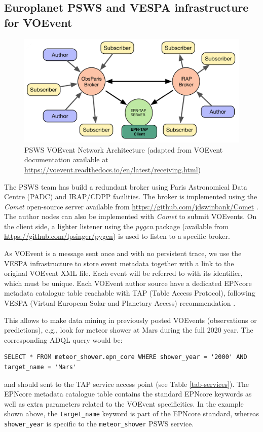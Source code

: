 \documentclass[referee,a4paper,12pt,traditabstract]{swsc}
\begin{document}
\begin{linenumbers}
\section{Europlanet PSWS and VESPA infrastructure for VOEvent}

\begin{figure}
\centering\includegraphics[width=0.7\linewidth]{figure-psws-network.png}
\caption{PSWS VOEvent Network Architecture (adapted from VOEvent documentation available at \url{https://voevent.readthedocs.io/en/latest/receiving.html})}
\label{fig:architecture}
\end{figure}

The PSWS team has build a redundant broker using Paris Astronomical Data Centre (PADC) and IRAP/CDPP facilities.  The broker is implemented using the \emph{Comet} open-source server available from \url{https://github.com/jdswinbank/Comet} \cite{Swinbank:2014ft}. The author nodes can also be implemented with \emph{Comet} to submit VOEvents. On the client side, a lighter listener using the \emph{pygcn} package (available from \url{https://github.com/lpsinger/pygcn}) is used to listen to a specific broker. 


As VOEvent is a message sent once and with no persistent trace, we use the VESPA infrastructure to store event metadata together with a link to the original VOEvent XML file. Each event will be referred to with its identifier, which must be unique. Each VOEvent author source have a dedicated EPNcore metadata catalogue table reachable with TAP (Table Access Protocol), following VESPA (Virtual European Solar and Planetary Access) recommendation \cite{vespa}.

This allows to make data mining in previously posted VOEvents (observations or predictions), e.g., look for meteor shower at Mars during the full 2020 year. The corresponding ADQL \cite{adql} query would be:
\begin{verbatim}
SELECT * FROM meteor_shower.epn_core WHERE shower_year = '2000' AND 
target_name = 'Mars' 
\end{verbatim}
and should sent to the TAP service access point (see Table \ref{tab-services}). The EPNcore metadata catalogue table contains the standard EPNcore keywords as well as extra parameters related to the VOEvent specificities. In the example shown above, the {\tt target\_name} keyword is part of the EPNcore standard, whereas {\tt shower\_year} is specific to the {\tt meteor\_shower} PSWS service.


\end{linenumbers}
\end{document}
